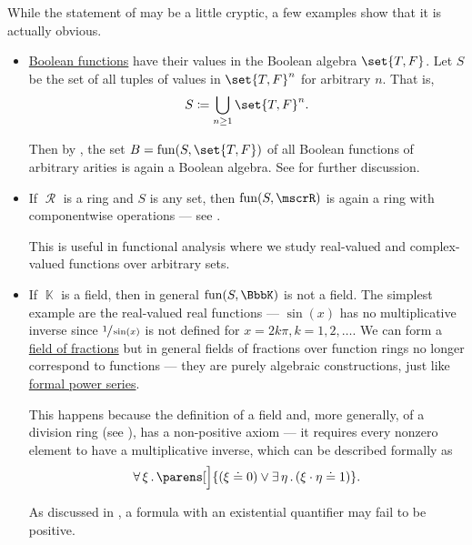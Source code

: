 \begin{example}\label{ex:thm:functions_over_model_of_positive_formulas_form_model}
  While the statement of  may be a little cryptic, a few examples show that it is actually obvious.
  \begin{itemize}
    \item \hyperref[def:boolean_function]{Boolean functions} have their values in the Boolean algebra \( \set{ T, F } \). Let \( S \) be the set of all tuples of values in \( \set{ T, F }^n \) for arbitrary \( n \). That is,
    \begin{equation*}
      S \coloneqq \bigcup_{n \geq 1} \set{ T, F }^n.
    \end{equation*}

    Then by , the set \( B = \fun(S, \set{ T, F }) \) of all Boolean functions of arbitrary arities is again a Boolean algebra. See  for further discussion.

    \item If \( \mscrR \) is a ring and \( S \) is any set, then \( \fun(S, \mscrR) \) is again a ring with componentwise operations --- see .

    This is useful in functional analysis where we study real-valued and complex-valued functions over arbitrary sets.

    \item If \( \BbbK \) is a field, then in general \( \fun(S, \BbbK) \) is not a field. The simplest example are the real-valued real functions --- \( \sin(x) \) has no multiplicative inverse since \( \sfrac 1 {\sin(x)} \) is not defined for \( x = 2k\pi, k = 1, 2, \ldots \). We can form a \hyperref[def:field_of_fractions]{field of fractions} but in general fields of fractions over function rings no longer correspond to functions --- they are purely algebraic constructions, just like \hyperref[def:formal_power_series]{formal power series}.

    This happens because the definition of a field and, more generally, of a division ring (see ), has a non-positive axiom --- it requires every nonzero element to have a multiplicative inverse, which can be described formally as
    \begin{equation*}
      \qforall \xi \parens[\Big]{ (\xi \doteq 0) \vee \qexists \eta (\xi \cdot \eta \doteq 1) }.
    \end{equation*}

    As discussed in , a formula with an existential quantifier may fail to be positive.
  \end{itemize}
\end{example}
